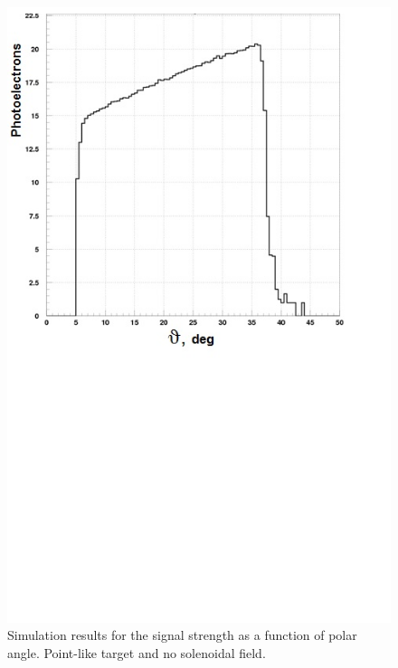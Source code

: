 \begin{figure}[!ht]
    \centering
    \includegraphics[width=1.0\linewidth,trim={0.0cm 9.4cm 0.0cm 0.0cm},clip]{images/Point_Targ_Zero_Field_Theta.jpg}
    \caption{Simulation results for the signal strength as a function of polar angle. Point-like target and no solenoidal
      field.}
    \label{fig:Point_Targ_Zero_Field_Theta}
\end{figure}

